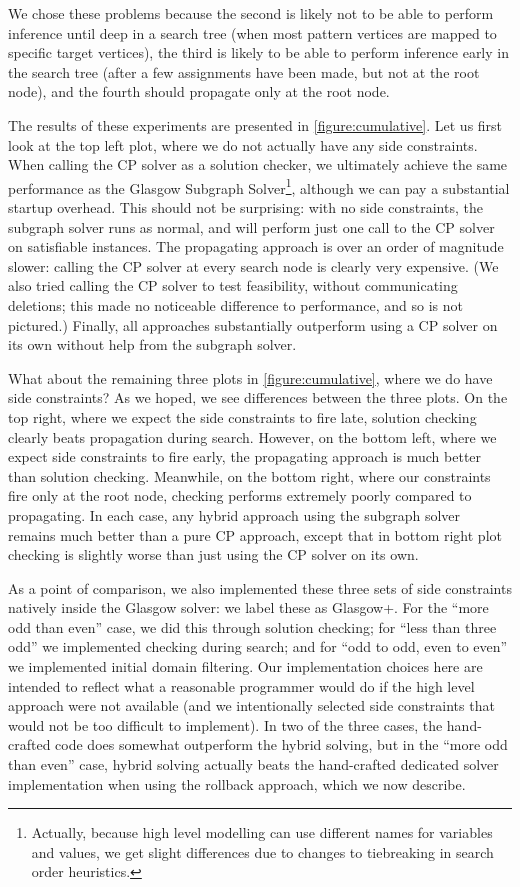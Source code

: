 \documentclass[runningheads]{llncs}
\begin{document}
We chose these problems because the second is likely not to be able to
perform inference until deep in a search tree (when most pattern vertices are mapped to specific
target vertices), the third is likely to be able to perform inference early in the search tree
(after a few assignments have been made, but not at the root node), and the fourth should propagate
only at the root node.

The results of these experiments are presented in \cref{figure:cumulative}. Let us first look at the
top left plot, where we do not actually have any side constraints. When calling the CP solver as a
solution checker, we ultimately achieve the same performance as the Glasgow Subgraph
Solver\footnote{Actually, because high level modelling can use different names for variables and
values, we get slight differences due to changes to tiebreaking in search order heuristics.},
although we can pay a substantial startup overhead. This should not be surprising: with no side
constraints, the subgraph solver runs as normal, and will perform just one call to the CP solver on
satisfiable instances. The propagating approach is over an order of magnitude slower: calling the CP
solver at every search node is clearly very expensive. (We also tried calling the CP solver to test
feasibility, without communicating deletions; this made no noticeable difference to performance, and
so is not pictured.) Finally, all approaches substantially outperform using a CP solver on its own
without help from the subgraph solver.

What about the remaining three plots in \cref{figure:cumulative}, where we do have side constraints?
As we hoped, we see differences between the three plots. On the top right, where we expect the side
constraints to fire late, solution checking clearly beats propagation during search. However, on the
bottom left, where we expect side constraints to fire early, the propagating approach is much better
than solution checking. Meanwhile, on the bottom right, where our constraints fire only at the root
node, checking performs extremely poorly compared to propagating. In each case, any hybrid approach using
the subgraph solver remains much better than a pure CP approach, except that in bottom right plot
checking is slightly worse than just using the CP solver on its own.

As a point of comparison, we also implemented these three sets of side constraints natively inside
the Glasgow solver: we label these as Glasgow+. For the ``more odd than even'' case, we did this
through solution checking; for ``less than three odd'' we implemented checking during search; and
for ``odd to odd, even to even'' we implemented initial domain filtering. Our implementation choices
here are intended to reflect what a reasonable programmer would do if the high level approach were
not available (and we intentionally selected side constraints that would not be too difficult to
implement). In two of the three cases, the hand-crafted code does somewhat outperform the hybrid
solving, but in the ``more odd than even'' case, hybrid solving actually beats the hand-crafted
dedicated solver implementation when using the rollback approach, which we now describe.
\end{document}
